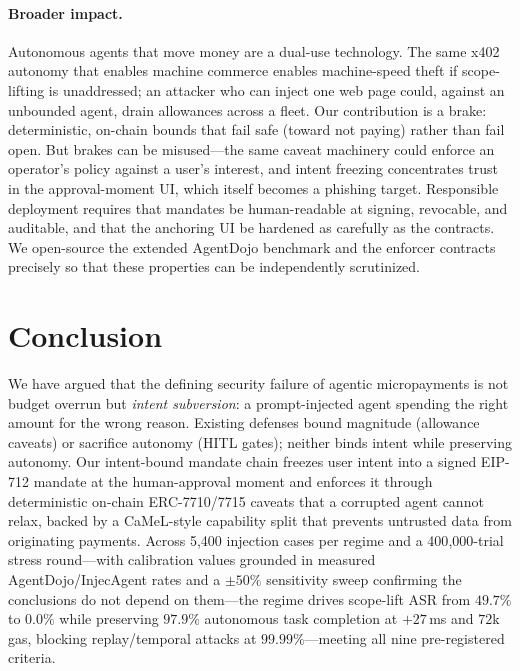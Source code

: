 \documentclass[10pt,twocolumn,letterpaper]{article}
\begin{document}
\paragraph{Broader impact.} Autonomous agents that move money are a dual-use technology. The same x402 autonomy that enables machine commerce enables machine-speed theft if scope-lifting is unaddressed; an attacker who can inject one web page could, against an unbounded agent, drain allowances across a fleet. Our contribution is a brake: deterministic, on-chain bounds that fail safe (toward not paying) rather than fail open. But brakes can be misused---the same caveat machinery could enforce an operator's policy against a user's interest, and intent freezing concentrates trust in the approval-moment UI, which itself becomes a phishing target. Responsible deployment requires that mandates be human-readable at signing, revocable, and auditable, and that the anchoring UI be hardened as carefully as the contracts. We open-source the extended AgentDojo benchmark and the enforcer contracts precisely so that these properties can be independently scrutinized.

\section{Conclusion}

We have argued that the defining security failure of agentic micropayments is not budget overrun but \emph{intent subversion}: a prompt-injected agent spending the right amount for the wrong reason. Existing defenses bound magnitude (allowance caveats) or sacrifice autonomy (HITL gates); neither binds intent while preserving autonomy. Our intent-bound mandate chain freezes user intent into a signed EIP-712 mandate at the human-approval moment and enforces it through deterministic on-chain ERC-7710/7715 caveats that a corrupted agent cannot relax, backed by a CaMeL-style capability split that prevents untrusted data from originating payments. Across 5{,}400 injection cases per regime and a 400{,}000-trial stress round---with calibration values grounded in measured AgentDojo/InjecAgent rates and a $\pm50\%$ sensitivity sweep confirming the conclusions do not depend on them---the regime drives scope-lift ASR from $49.7\%$ to $0.0\%$ while preserving $97.9\%$ autonomous task completion at $+27$\,ms and $72$k gas, blocking replay/temporal attacks at $99.99\%$---meeting all nine pre-registered criteria.
\end{document}

